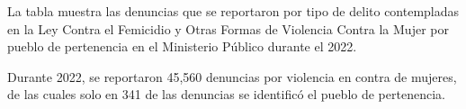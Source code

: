 La tabla muestra las denuncias que se reportaron por tipo de delito contempladas en la Ley Contra el Femicidio y Otras Formas de Violencia Contra la Mujer por pueblo de pertenencia en el Ministerio Público durante el 2022. 

Durante 2022, se reportaron 45,560 denuncias por violencia en contra de mujeres, de las cuales solo en 341 de las denuncias se identificó el pueblo de pertenencia.
